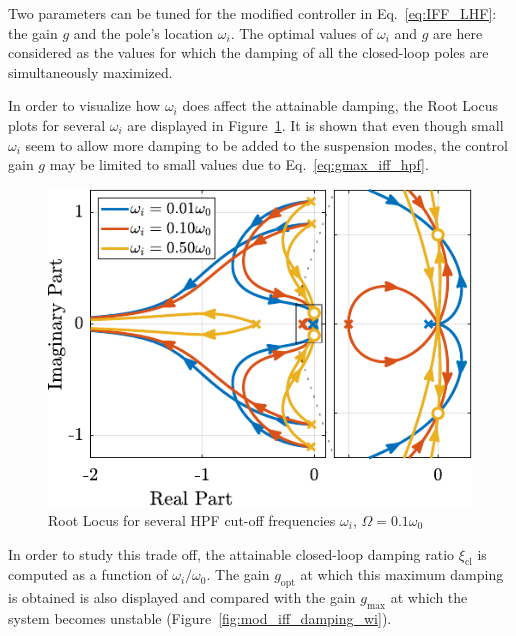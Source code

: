 \documentclass[10pt]{iopart}
\begin{document}
\par
Two parameters can be tuned for the modified controller in Eq.~\eqref{eq:IFF_LHF}: the gain \(g\) and the pole's location \(\omega_i\).
The optimal values of \(\omega_i\) and \(g\) are here considered as the values for which the damping of all the closed-loop poles are simultaneously maximized.

In order to visualize how \(\omega_i\) does affect the attainable damping, the Root Locus plots for several \(\omega_i\) are displayed in Figure~\ref{fig:root_locus_wi_modified_iff}.
It is shown that even though small \(\omega_i\) seem to allow more damping to be added to the suspension modes, the control gain \(g\) may be limited to small values due to Eq.~\eqref{eq:gmax_iff_hpf}.

\begin{figure}[htbp]
\centering
\includegraphics[scale=1,scale=0.95]{figs/fig10.pdf}
\caption{\label{fig:root_locus_wi_modified_iff}Root Locus for several HPF cut-off frequencies \(\omega_i\), \(\Omega = 0.1 \omega_0\)}
\end{figure}

In order to study this trade off, the attainable closed-loop damping ratio \(\xi_{\text{cl}}\) is computed as a function of \(\omega_i/\omega_0\).
The gain \(g_{\text{opt}}\) at which this maximum damping is obtained is also displayed and compared with the gain \(g_{\text{max}}\) at which the system becomes unstable (Figure~\ref{fig:mod_iff_damping_wi}).
\end{document}
